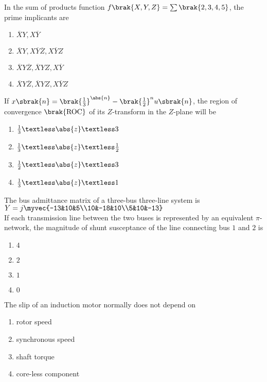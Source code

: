 \item{
In the sum of products function $f\brak{X,Y,Z}=\sum\brak{2,3,4,5}$, the prime implicants are 
\begin{multicols}{4}
\begin{enumerate}
\item $\overline{X}Y,X\overline{Y}$
\item $\overline{X}Y,X\overline{Y}\overline{Z},X\overline{Y}Z$
\item $\overline{X}Y\overline{Z},\overline{X}YZ,X\overline{Y}$
\item $\overline{X}Y\overline{Z},\overline{X}YZ,X\overline{Y}Z$
\end{enumerate}
\end{multicols}
}
\item{
If $x\sbrak{n}=\brak{\frac{1}{3}}^{\abs{n}}-\brak{\frac{1}{2}}^nu\sbrak{n}$, the region of convergence $\brak{\text{ROC}}$ of its $Z$-transform in the $Z$-plane will be
\begin{multicols}{4}
\begin{enumerate}
\item $\frac{1}{3}\textless\abs{z}\textless 3$
\item $\frac{1}{3}\textless\abs{z}\textless\frac{1}{2}$
\item $\frac{1}{2}\textless\abs{z}\textless 3$
\item $\frac{1}{3}\textless\abs{z}\textless 1$
\end{enumerate}
\end{multicols}
}
\item{
The bus admittance matrix of a three-bus three-line system is\\ $Y=j\myvec{-13&10&5\\10&-18&10\\5&10&-13}$\\If each transmission line between the two buses is represented by an equivalent $\pi$-network, the magnitude of shunt susceptance of the line connecting bus $1$ and $2$ is
\begin{multicols}{4}
\begin{enumerate}
\item $4$
\item $2$
\item $1$
\item $0$
\end{enumerate}
\end{multicols}
}
\item{
The slip of an induction motor normally does not depend on 
\begin{multicols}{2}
\begin{enumerate}
\item rotor speed
\item synchronous speed
\item shaft torque
\item core-less component
\end{enumerate}
\end{multicols}
}
